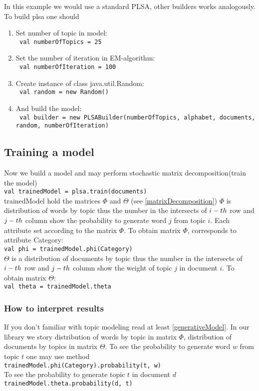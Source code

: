     In this example we would
    use a standard PLSA, other builders works analogously.  To build plsa one should
    \begin{enumerate}
	\item Set number of topic in model: \\ \texttt{ val numberOfTopics = 25}
	\item Set the number of iteration in EM\--algorithm: \\ \texttt{ val numberOfIteration = 100}
	\item Create instance of class java.util.Random: \\     \texttt{ val random = new Random()}
	\item And build the model: \\ \texttt{ val builder = new PLSABuilder(numberOfTopics, alphabet, documents, random,  numberOfIteration)}
    \end{enumerate}

\subsection{Training a model}
    Now we build a model and may perform stochastic matrix decomposition(train the model) \\
    \texttt{val trainedModel = plsa.train(documents)}\\
    trainedModel hold the matrices $\Phi$ and $\Theta$ (see \ref{matrixDecomposition})
    $\Phi$ is distribution of words by topic thus the number in the intersects of $i\--th$ row and $j\--th$ column show the
    probability to generate word $j$ from topic $i$. Each attribute set according to the matrix $\Phi$.
    To obtain matrix $\Phi$, corresponds to attribute Category:\\
    \texttt{val phi = trainedModel.phi(Category)}\\
    $\Theta$ is a distribution of documents by topic thus the number in the intersects of $i\--th$ row and $j\--th$ column show
    the weight of topic $j$ in document $i$.
    To obtain matrix $\Theta$: \\
    \texttt{val theta = trainedModel.theta}\\

    \subsubsection{How to interpret results}
	If you don't familiar with topic modeling read at least \ref{generativeModel}. In our library we story distribution of words by topic in matrix $\Phi$,
	distribution of documents by topics in matrix $\Theta$. To see the probability to generate word $w$ from topic $t$ one may use method \\
	\texttt{trainedModel.phi(Category).probability(t, w)}\\
	To see the probability to generate topic $t$ in document $d$ \\
	\texttt{trainedModel.theta.probability(d, t)}\\
    
